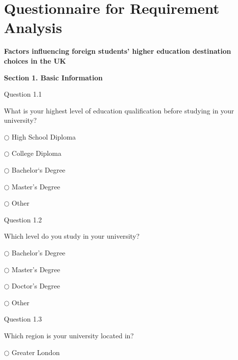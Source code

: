 \chapter{Questionnaire for Requirement Analysis} \label{Chapter:Appendix A}







\begin{center}
\textbf{Factors influencing foreign students' higher education destination 
choices in the UK}
\end{center}

\begin{center}
\textbf{Section 1. Basic Information}
\end{center}

Question 1.1

What is your highest level of education qualification before studying in 
your university?

$\bigcirc $ High School Diploma

$\bigcirc $ College Diploma

$\bigcirc $ Bachelor`s Degree

$\bigcirc $ Master's Degree

$\bigcirc $ Other


Question 1.2

Which level do you study in your university?

$\bigcirc $ Bachelor's Degree

$\bigcirc $ Master's Degree

$\bigcirc $ Doctor's Degree

$\bigcirc $ Other


Question 1.3

Which region is your university located in?

$\bigcirc $ Greater London

